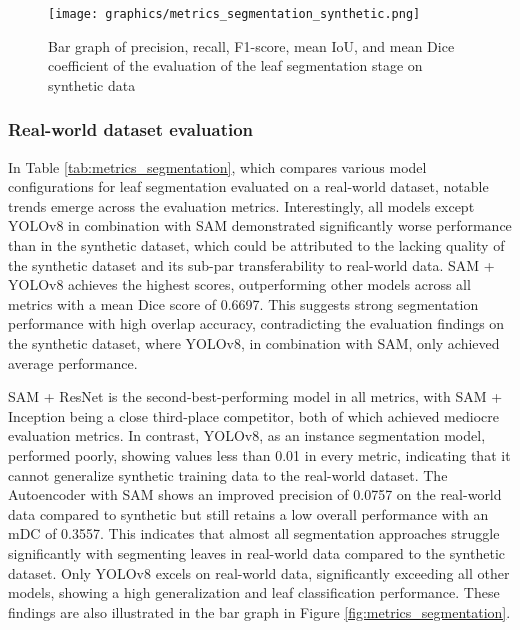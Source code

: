 \documentclass[draft,final]{vutinfth} %
\begin{document}
\begin{figure}
    \centering
    \texttt{[image: graphics/metrics\_segmentation\_synthetic.png]}
    \caption{Bar graph of precision, recall, F1-score, mean IoU, and mean Dice coefficient of the evaluation of the leaf segmentation stage on synthetic data}
    \label{fig:metrics_segmentation_synthetic}
\end{figure}

\subsubsection{Real-world dataset evaluation}
In Table \ref{tab:metrics_segmentation}, which compares various model configurations for leaf segmentation evaluated on a real-world dataset, notable trends emerge across the evaluation metrics.
Interestingly, all models except YOLOv8 in combination with SAM demonstrated significantly worse performance than in the synthetic dataset, which could be attributed to the lacking quality of the synthetic dataset and its sub-par transferability to real-world data. SAM + YOLOv8 achieves the highest scores, outperforming other models across all metrics with a mean Dice score of 0.6697. This suggests strong segmentation performance with high overlap accuracy, contradicting the evaluation findings on the synthetic dataset, where YOLOv8, in combination with SAM, only achieved average performance. 

SAM + ResNet is the second-best-performing model in all metrics, with SAM + Inception being a close third-place competitor, both of which achieved mediocre evaluation metrics. In contrast, YOLOv8, as an instance segmentation model, performed poorly, showing values less than 0.01 in every metric, indicating that it cannot generalize synthetic training data to the real-world dataset. The Autoencoder with SAM shows an improved precision of 0.0757 on the real-world data compared to synthetic but still retains a low overall performance with an mDC of 0.3557. This indicates that almost all segmentation approaches struggle significantly with segmenting leaves in real-world data compared to the synthetic dataset. Only YOLOv8 excels on real-world data, significantly exceeding all other models, showing a high generalization and leaf classification performance.
These findings are also illustrated in the bar graph in Figure \ref{fig:metrics_segmentation}.
\end{document}
